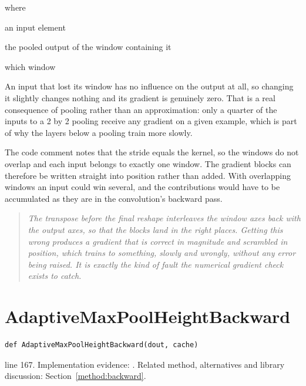 \noindent where
\begin{description}[leftmargin=2.4em,style=nextline,font=\normalfont\ttfamily]\setlength\itemsep{1pt}
  \item[{$x[b,c,i,j]$}] \normalfont an input element
  \item[{$y[b,c,p,q]$}] \normalfont the pooled output of the window containing it
  \item[{$(p,q)$}] \normalfont which window
\end{description}
An input that lost its window has no influence on the output at all, so changing it slightly changes nothing and its gradient is genuinely zero. That is a real consequence of pooling rather than an approximation: only a quarter of the inputs to a 2 by 2 pooling receive any gradient on a given example, which is part of why the layers below a pooling train more slowly.


The code comment notes that the stride equals the kernel, so the windows do not overlap and each input belongs to exactly one window. The gradient blocks can therefore be written straight into position rather than added. With overlapping windows an input could win several, and the contributions would have to be accumulated as they are in the convolution's backward pass.


\begin{quote}\small\itshape The transpose before the final reshape interleaves the window axes back with the output axes, so that the blocks land in the right places. Getting this wrong produces a gradient that is correct in magnitude and scrambled in position, which trains to something, slowly and wrongly, without any error being raised. It is exactly the kind of fault the numerical gradient check exists to catch.\end{quote}


\section{AdaptiveMaxPoolHeightBackward}\label{fn:train:AdaptiveMaxPoolHeightBackward}
\begin{lstlisting}[style=sig]
def AdaptiveMaxPoolHeightBackward(dout, cache)
\end{lstlisting}
 line 167. Implementation evidence: \cite{code2026}. Related method, alternatives and library discussion: Section~\ref{method:backward}.


